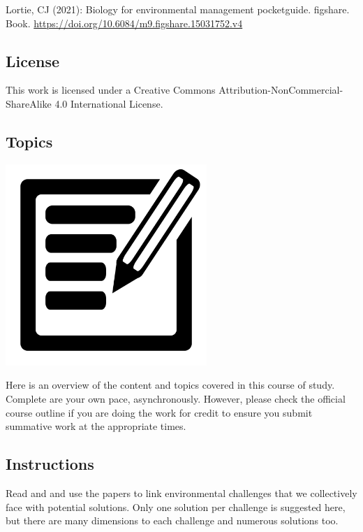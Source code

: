 \documentclass[
]{book}
\begin{document}
Lortie, CJ (2021): Biology for environmental management pocketguide. figshare. Book. \url{https://doi.org/10.6084/m9.figshare.15031752.v4}

\hypertarget{license}{%
\subsection*{License}\label{license}}

This work is licensed under a Creative Commons Attribution-NonCommercial-ShareAlike 4.0 International License.

\hypertarget{topics}{%
\subsection*{Topics}\label{topics}}

\includegraphics[width=3in,height=\textheight]{./outline.png}

Here is an overview of the content and topics covered in this course of study. Complete are your own pace, asynchronously. However, please check the official course outline if you are doing the work for credit to ensure you submit summative work at the appropriate times.

\hypertarget{instructions}{%
\subsection*{Instructions}\label{instructions}}

Read and and use the papers to link environmental challenges that we collectively face with potential solutions. Only one solution per challenge is suggested here, but there are many dimensions to each challenge and numerous solutions too.
\end{document}
